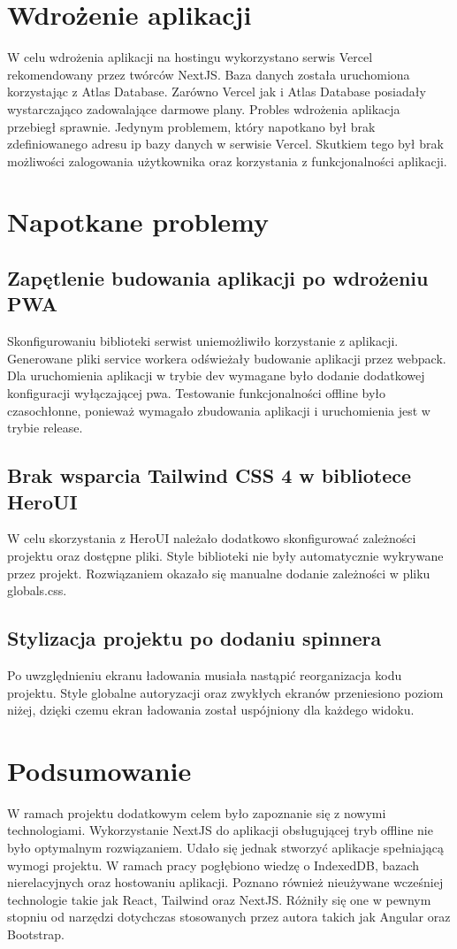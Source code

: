 \documentclass[11pt,titlepage]{article}
\begin{document}
\section{Wdrożenie aplikacji}
W celu wdrożenia aplikacji na hostingu wykorzystano serwis Vercel rekomendowany przez twórców NextJS. Baza danych została uruchomiona korzystając z Atlas Database. Zarówno Vercel jak i Atlas Database posiadały wystarczająco zadowalające darmowe plany. Probles wdrożenia aplikacja przebiegł sprawnie. Jedynym problemem, który napotkano był brak zdefiniowanego adresu ip bazy danych w serwisie Vercel. Skutkiem tego był brak możliwości zalogowania użytkownika oraz korzystania z funkcjonalności aplikacji.

\section{Napotkane problemy}
\subsection{Zapętlenie budowania aplikacji po wdrożeniu PWA}
Skonfigurowaniu biblioteki serwist uniemożliwiło korzystanie z aplikacji. Generowane pliki service workera odświeżały budowanie aplikacji przez webpack. Dla uruchomienia aplikacji w trybie dev wymagane było dodanie dodatkowej konfiguracji wyłączającej pwa. Testowanie funkcjonalności offline było czasochłonne, ponieważ wymagało zbudowania aplikacji i uruchomienia jest w trybie release.

\subsection{Brak wsparcia Tailwind CSS 4 w bibliotece HeroUI}
W celu skorzystania z HeroUI należało dodatkowo skonfigurować zależności projektu oraz dostępne pliki. Style biblioteki nie były automatycznie wykrywane przez projekt. Rozwiązaniem okazało się manualne dodanie zależności w pliku globals.css.

\subsection{Stylizacja projektu po dodaniu spinnera}
Po uwzględnieniu ekranu ładowania musiała nastąpić reorganizacja kodu projektu. Style globalne autoryzacji oraz zwykłych ekranów przeniesiono poziom niżej, dzięki czemu ekran ładowania został uspójniony dla każdego widoku.

\section{Podsumowanie}
W ramach projektu dodatkowym celem było zapoznanie się z nowymi technologiami. Wykorzystanie NextJS do aplikacji obsługującej tryb offline nie było optymalnym rozwiązaniem. Udało się jednak stworzyć aplikacje spełniającą wymogi projektu. W ramach pracy pogłębiono wiedzę o IndexedDB, bazach nierelacyjnych oraz hostowaniu aplikacji. Poznano również nieużywane wcześniej technologie takie jak React, Tailwind oraz NextJS. Różniły się one w pewnym stopniu od narzędzi dotychczas stosowanych przez autora takich jak Angular oraz Bootstrap.
\end{document}
